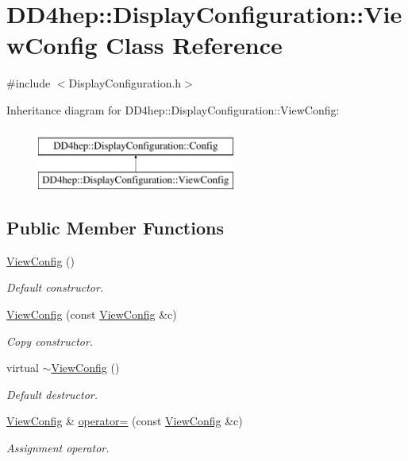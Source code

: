 \hypertarget{class_d_d4hep_1_1_display_configuration_1_1_view_config}{}\section{D\+D4hep\+:\+:Display\+Configuration\+:\+:View\+Config Class Reference}
\label{class_d_d4hep_1_1_display_configuration_1_1_view_config}


{\ttfamily \#include $<$Display\+Configuration.\+h$>$}

Inheritance diagram for D\+D4hep\+:\+:Display\+Configuration\+:\+:View\+Config\+:\begin{figure}[H]
\begin{center}
\leavevmode
\includegraphics[height=2.000000cm]{class_d_d4hep_1_1_display_configuration_1_1_view_config}
\end{center}
\end{figure}
\subsection*{Public Member Functions}
\begin{DoxyCompactItemize}
\item 
\hyperlink{class_d_d4hep_1_1_display_configuration_1_1_view_config_a9c9aa8312c88a38b22821eec6fff56d7}{View\+Config} ()
\begin{DoxyCompactList}\small\item\em Default constructor. \end{DoxyCompactList}\item 
\hyperlink{class_d_d4hep_1_1_display_configuration_1_1_view_config_a0aa07c8fc66c04a825f00a06f8812bd3}{View\+Config} (const \hyperlink{class_d_d4hep_1_1_display_configuration_1_1_view_config}{View\+Config} \&c)
\begin{DoxyCompactList}\small\item\em Copy constructor. \end{DoxyCompactList}\item 
virtual \hyperlink{class_d_d4hep_1_1_display_configuration_1_1_view_config_ae166c3b81d063af96886587532ac2d77}{$\sim$\+View\+Config} ()
\begin{DoxyCompactList}\small\item\em Default destructor. \end{DoxyCompactList}\item 
\hyperlink{class_d_d4hep_1_1_display_configuration_1_1_view_config}{View\+Config} \& \hyperlink{class_d_d4hep_1_1_display_configuration_1_1_view_config_ad1dfdd8cd31d55cb2d6aac98d9ec0268}{operator=} (const \hyperlink{class_d_d4hep_1_1_display_configuration_1_1_view_config}{View\+Config} \&c)
\begin{DoxyCompactList}\small\item\em Assignment operator. \end{DoxyCompactList}\end{DoxyCompactItemize}

